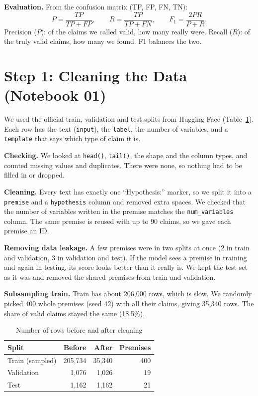 \documentclass[conference]{IEEEtran}
\begin{document}
\textbf{Evaluation.} From the confusion matrix (TP, FP, FN, TN):
\begin{equation}
P = \frac{TP}{TP+FP},\qquad R = \frac{TP}{TP+FN},\qquad F_1 = \frac{2PR}{P+R}.
\label{eq:f1}
\end{equation}
Precision ($P$): of the claims we called valid, how many really were. Recall ($R$): of the truly valid claims, how many we
found. F1 balances the two.

\section{Step 1: Cleaning the Data (Notebook 01)}
We used the official train, validation and test splits from Hugging Face (Table~\ref{tab:data}). Each row has
the text (\texttt{input}), the \texttt{label}, the number of variables, and a \texttt{template} that says which
type of claim it is.

\textbf{Checking.} We looked at \texttt{head()}, \texttt{tail()}, the shape and the column types, and counted
missing values and duplicates. There were none, so nothing had to be filled in or dropped.

\textbf{Cleaning.} Every text has exactly one ``Hypothesis:'' marker, so we split it into a \texttt{premise} and
a \texttt{hypothesis} column and removed extra spaces. We checked that the number of variables written in the
premise matches the \texttt{num\_variables} column. The same premise is reused with up to 90 claims, so we gave
each premise an ID.

\textbf{Removing data leakage.} A few premises were in two splits at once (2 in train and validation, 3 in
validation and test). If the model sees a premise in training and again in testing, its score looks better than
it really is. We kept the test set as it was and removed the shared premises from train and validation.

\textbf{Subsampling train.} Train has about 206{,}000 rows, which is slow. We randomly picked 400 whole premises
(seed 42) with all their claims, giving 35{,}340 rows. The share of valid claims stayed the same (18.5\%).

\begin{table}[t]
\centering
\caption{Number of rows before and after cleaning}
\label{tab:data}
\begin{tabular}{lrrr}
\toprule
Split & Before & After & Premises \\
\midrule
Train (sampled) & 205{,}734 & 35{,}340 & 400 \\
Validation & 1{,}076 & 1{,}026 & 19 \\
Test & 1{,}162 & 1{,}162 & 21 \\
\bottomrule
\end{tabular}
\end{table}
\end{document}
